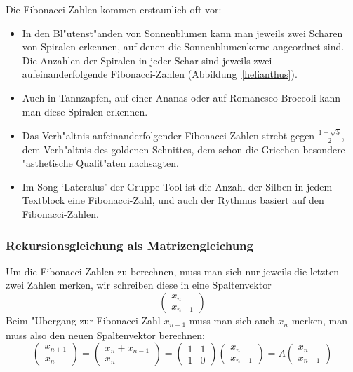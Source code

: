 Die Fibonacci-Zahlen kommen erstaunlich oft vor:
\begin{itemize}
\item In den Bl"utenst"anden von Sonnenblumen kann man jeweils zwei
Scharen von Spiralen erkennen, auf denen die Sonnenblumenkerne angeordnet sind.
Die Anzahlen der Spiralen in jeder Schar sind jeweils zwei aufeinanderfolgende
Fibonacci-Zahlen (Abbildung~\ref{helianthus}).
\item Auch in Tannzapfen, auf einer Ananas oder auf Romanesco-Broccoli
kann man diese Spiralen erkennen.
\item Das Verh"altnis aufeinanderfolgender Fibonacci-Zahlen strebt gegen
$\frac{1+\sqrt{5}}2$, dem Verh"altnis des goldenen Schnittes, dem schon die
Griechen besondere "asthetische Qualit"aten nachsagten.
\item Im Song `Lateralus' der Gruppe Tool ist die Anzahl der Silben
in jedem Textblock eine Fibonacci-Zahl, und auch der Rythmus basiert
auf den Fibonacci-Zahlen.
\end{itemize}

\subsubsection{Rekursionsgleichung als Matrizengleichung}
Um die Fibonacci-Zahlen zu berechnen, muss man sich nur jeweils die letzten zwei
Zahlen merken, wir schreiben diese in eine Spaltenvektor
\[
\begin{pmatrix}x_n\\x_{n-1}\end{pmatrix}
\]
Beim "Ubergang zur Fibonacci-Zahl $x_{n+1}$ muss man sich auch $x_n$ merken,
man muss also den neuen Spaltenvektor berechnen:
\begin{equation}
\begin{pmatrix}x_{n+1}\\x_n\end{pmatrix}
=
\begin{pmatrix}x_n+x_{n-1}\\x_n\end{pmatrix}
=
\begin{pmatrix}
1&1\\
1&0
\end{pmatrix}
\begin{pmatrix}x_n\\x_{n-1}\end{pmatrix}
=
A
\begin{pmatrix}x_n\\x_{n-1}\end{pmatrix}
\label{fibonaccirekursion}
\end{equation}
